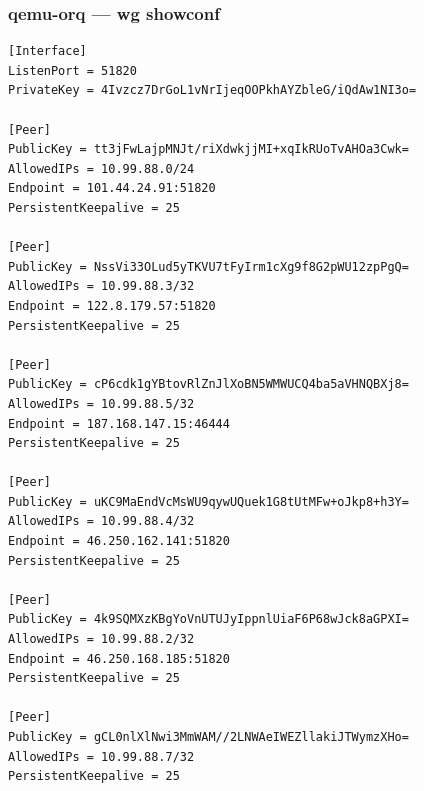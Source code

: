 \documentclass[11pt,a4paper]{article}
\begin{document}
\subsubsection*{qemu-orq — wg showconf}
\begin{lstlisting}
[Interface]
ListenPort = 51820
PrivateKey = 4Ivzcz7DrGoL1vNrIjeqOOPkhAYZbleG/iQdAw1NI3o=

[Peer]
PublicKey = tt3jFwLajpMNJt/riXdwkjjMI+xqIkRUoTvAHOa3Cwk=
AllowedIPs = 10.99.88.0/24
Endpoint = 101.44.24.91:51820
PersistentKeepalive = 25

[Peer]
PublicKey = NssVi33OLud5yTKVU7tFyIrm1cXg9f8G2pWU12zpPgQ=
AllowedIPs = 10.99.88.3/32
Endpoint = 122.8.179.57:51820
PersistentKeepalive = 25

[Peer]
PublicKey = cP6cdk1gYBtovRlZnJlXoBN5WMWUCQ4ba5aVHNQBXj8=
AllowedIPs = 10.99.88.5/32
Endpoint = 187.168.147.15:46444
PersistentKeepalive = 25

[Peer]
PublicKey = uKC9MaEndVcMsWU9qywUQuek1G8tUtMFw+oJkp8+h3Y=
AllowedIPs = 10.99.88.4/32
Endpoint = 46.250.162.141:51820
PersistentKeepalive = 25

[Peer]
PublicKey = 4k9SQMXzKBgYoVnUTUJyIppnlUiaF6P68wJck8aGPXI=
AllowedIPs = 10.99.88.2/32
Endpoint = 46.250.168.185:51820
PersistentKeepalive = 25

[Peer]
PublicKey = gCL0nlXlNwi3MmWAM//2LNWAeIWEZllakiJTWymzXHo=
AllowedIPs = 10.99.88.7/32
PersistentKeepalive = 25

\end{lstlisting}
\end{document}
